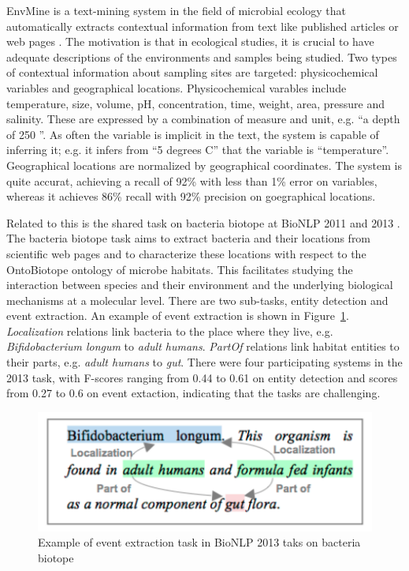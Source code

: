 EnvMine is a text-mining system in the field of microbial ecology that automatically extracts contextual information from text like published articles or web pages \cite{Tamames2010EnvMine}.
The motivation is that in ecological studies, it is crucial to have adequate descriptions of the environments and samples being studied. 
Two types of contextual information about sampling sites are targeted: physicochemical variables and geographical locations.
Physicochemical varables include temperature, size, volume, pH, concentration, time, weight, area, pressure and salinity.
These are expressed by a combination of measure and unit, e.g. ``a depth of 250 ''.
As often the variable is implicit in the text, the system is capable of inferring it; e.g. it infers from ``5 degrees C'' that the variable is ``temperature''.  
Geographical locations are normalized by geographical coordinates. 
The system is quite accurat, achieving a recall of 92\% with less than 1\% error on variables, whereas it achieves 86\% recall with 92\% precision on goegraphical locations.

Related to this is the shared task on bacteria biotope at BioNLP 2011 and 2013 \citep{bossy2013bionlp}.
The bacteria biotope task aims to extract bacteria and their locations from scientific web pages and to characterize these locations with respect to the OntoBiotope ontology of microbe habitats.
This facilitates studying the interaction between species and their environment and  the underlying biological mechanisms at a molecular level.
There are two sub-tasks, entity detection and event extraction.
An example of event extraction is shown in Figure~\ref{fig:biotope}.
\emph{Localization} relations link bacteria to the place where they live, e.g. \emph{Bifidobacterium longum} to \emph{adult humans}.
\emph{PartOf} relations link habitat entities to their parts, e.g. \emph{adult humans} to \emph{gut}.
There were four participating systems in the 2013 task, with F-scores ranging from 0.44 to 0.61 on entity detection and scores from 0.27 to 0.6 on event extaction, indicating that the tasks are challenging. 

\begin{figure}
\begin{center}
\includegraphics[scale=0.6]{figures/biotope.pdf}
 \caption{Example of event extraction task in BioNLP 2013 taks on bacteria biotope \citep{bossy2013bionlp}}
\label{fig:biotope}
\end{center}
\end{figure} 

